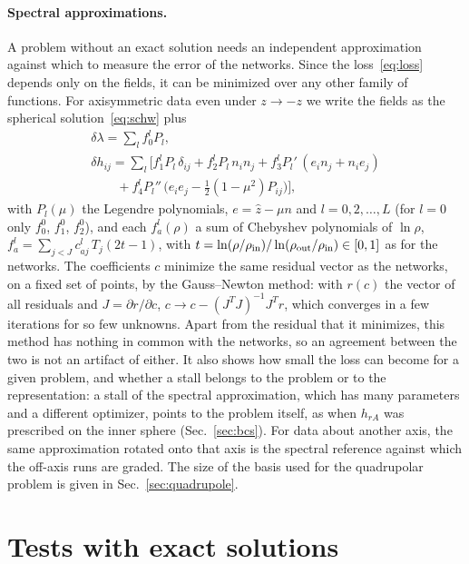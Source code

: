 \documentclass[aps,prd,twocolumn,superscriptaddress, nofootinbib,floatfix]{revtex4-2}
\begin{document}
\paragraph{Spectral approximations.}\label{sec:specref} A problem without an exact solution needs an independent approximation against which to measure the error of the networks.
Since the loss~\eqref{eq:loss} depends only on the fields, it can be minimized over any other family of functions.
For axisymmetric data even under $z\to-z$ we write the fields as the spherical solution~\eqref{eq:schw} plus
\begin{gather}
  \delta\lambda = \sum_l f^l_0 P_l , \nonumber\\
  \delta h_{ij} = \sum_l \bigl[ f^l_1 P_l\,\delta_{ij} + f^l_2 P_l\,n_in_j
     + f^l_3 P_l'\,(e_in_j+n_ie_j) \nonumber\\
     \qquad + f^l_4 P_l''\,\bigl(e_ie_j-\tfrac12(1-\mu^2)P_{ij}\bigr)\bigr] ,
  \label{eq:spectral}
\end{gather}
with $P_l(\mu)$ the Legendre polynomials, $e = \hat z-\mu n$ and $l = 0,2,\dots,L$ (for $l=0$ only $f^0_0$, $f^0_1$, $f^0_2$), and each $f^l_a(\rho)$ a sum of Chebyshev polynomials of $\ln\rho$, $f^l_a=\sum_{j<J} c^l_{aj}\,T_j(2t-1)$, with $t=\ln(\rho/\rho_{\rm in})/\ln(\rho_{\rm out}/\rho_{\rm in})\in[0,1]$ as for the networks.
The coefficients $c$ minimize the same residual vector as the networks, on a fixed set of points, by the Gauss--Newton method: with $r(c)$ the vector of all residuals and $J = \partial r/\partial c$, $c\to c-(J^TJ)^{-1}J^Tr$, which converges in a few iterations for so few unknowns.
Apart from the residual that it minimizes, this method has nothing in common with the networks, so an agreement between the two is not an artifact of either.
It also shows how small the loss can become for a given problem, and whether a stall belongs to the problem or to the representation: a stall of the spectral approximation, which has many parameters and a different optimizer, points to the problem itself, as when $h_{rA}$ was prescribed on the inner sphere (Sec.~\ref{sec:bcs}).
For data about another axis, the same approximation rotated onto that axis is the spectral reference against which the off-axis runs are graded.
The size of the basis used for the quadrupolar problem is given in Sec.~\ref{sec:quadrupole}.

\section{Tests with exact solutions}\label{sec:tests}
\end{document}

